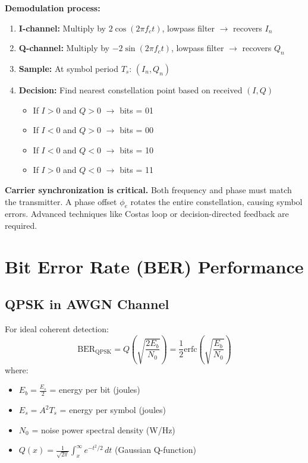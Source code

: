 \textbf{Demodulation process:}
\begin{enumerate}
\item \textbf{I-channel:} Multiply by $2\cos(2\pi f_c t)$, lowpass filter $\rightarrow$ recovers $I_n$
\item \textbf{Q-channel:} Multiply by $-2\sin(2\pi f_c t)$, lowpass filter $\rightarrow$ recovers $Q_n$
\item \textbf{Sample:} At symbol period $T_s$: $(I_n, Q_n)$
\item \textbf{Decision:} Find nearest constellation point based on received $(I, Q)$
  \begin{itemize}
  \item If $I > 0$ and $Q > 0$ $\rightarrow$ bits = 01
  \item If $I < 0$ and $Q > 0$ $\rightarrow$ bits = 00
  \item If $I < 0$ and $Q < 0$ $\rightarrow$ bits = 10
  \item If $I > 0$ and $Q < 0$ $\rightarrow$ bits = 11
  \end{itemize}
\end{enumerate}

\begin{warningbox}
\textbf{Carrier synchronization is critical.} Both frequency and phase must match the transmitter. A phase offset $\phi_e$ rotates the entire constellation, causing symbol errors. Advanced techniques like Costas loop or decision-directed feedback are required.
\end{warningbox}

\section{Bit Error Rate (BER) Performance}

\subsection{QPSK in AWGN Channel}

For ideal coherent detection:
\begin{equation}
\mathrm{BER}_{\mathrm{QPSK}} = Q\left(\sqrt{\frac{2E_b}{N_0}}\right) = \frac{1}{2}\mathrm{erfc}\left(\sqrt{\frac{E_b}{N_0}}\right)
\end{equation}
where:
\begin{itemize}
\item $E_b = \frac{E_s}{2}$ = energy per bit (joules)
\item $E_s = A^2 T_s$ = energy per symbol (joules)
\item $N_0$ = noise power spectral density (W/Hz)
\item $Q(x) = \frac{1}{\sqrt{2\pi}}\int_x^\infty e^{-t^2/2}\,dt$ (Gaussian Q-function)
\end{itemize}

